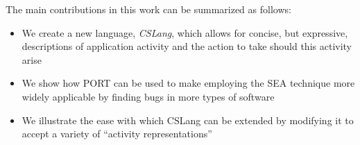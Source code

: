 The main contributions in this work can be summarized as follows:

\begin{itemize}

\item{We create a new language, {\em CSLang},
  which allows for concise, but expressive, descriptions of
    application activity and the action to take should this activity arise}

\item{We show how PORT can be used to make employing the SEA technique
  more widely applicable by finding bugs in more types of software}

\item{We illustrate the ease with which CSLang can be extended by modifying
  it to accept a variety of ``activity representations''}

\end{itemize}

